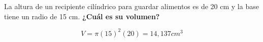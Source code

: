 \question[10] La altura de un recipiente cilíndrico para guardar alimentos es de 20 cm y la base tiene un
radio de 15 cm. \textbf{¿Cuál es su volumen?}

\begin{solutionbox}{1.5cm}
    \[V = \pi (15)^2 (20) = 14,137 cm^3 \]
\end{solutionbox}
